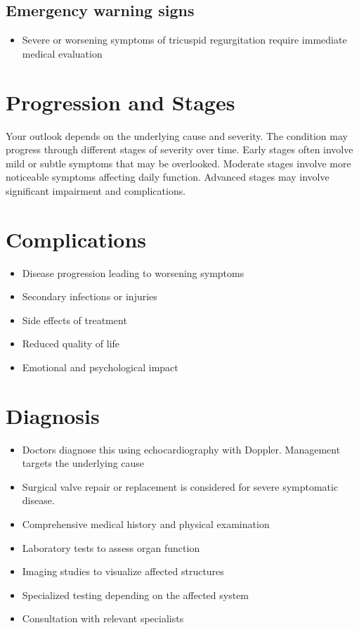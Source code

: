 \subsection{Emergency warning signs}
\begin{itemize}[noitemsep]
  \item Severe or worsening symptoms of tricuspid regurgitation require immediate medical evaluation
\end{itemize}
\section{Progression and Stages}
Your outlook depends on the underlying cause and severity. The condition may progress through different stages of severity over time. Early stages often involve mild or subtle symptoms that may be overlooked. Moderate stages involve more noticeable symptoms affecting daily function. Advanced stages may involve significant impairment and complications.
\section{Complications}
\begin{itemize}[noitemsep]
  \item Disease progression leading to worsening symptoms
  \item Secondary infections or injuries
  \item Side effects of treatment
  \item Reduced quality of life
  \item Emotional and psychological impact
\end{itemize}
\section{Diagnosis}
\begin{itemize}[noitemsep]
  \item Doctors diagnose this using echocardiography with Doppler. Management targets the underlying cause
  \item Surgical valve repair or replacement is considered for severe symptomatic disease.
  \item Comprehensive medical history and physical examination
  \item Laboratory tests to assess organ function
  \item Imaging studies to visualize affected structures
  \item Specialized testing depending on the affected system
  \item Consultation with relevant specialists
\end{itemize}
